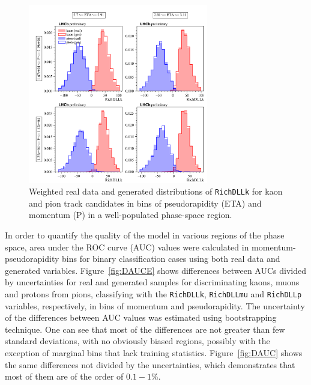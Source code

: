 \documentclass[a4paper]{jpconf}
\begin{document}
\begin{figure}
    \centering
    \includegraphics[width=0.7\textwidth]{kaon_vs_pion_RichDLLk_in_Brunel_P_vs_Brunel_ETA_8x8_S0_2_4_N_S1_2_4_N.pdf}
    \caption{Weighted real data and generated distributions of \texttt{RichDLLk} for kaon and pion track candidates in bins of pseudorapidity (ETA) and momentum (P) in a well-populated phase-space region.}
    \label{fig:RichDLLkZoomed}
\end{figure}

In order to quantify the quality of the model in various regions of the phase space, area under the ROC curve (AUC) values were calculated in momentum-pseudorapidity bins for binary classification cases using both real data and generated variables. Figure~\ref{fig:DAUCE} shows differences between AUCs divided by uncertainties for real and generated samples for discriminating kaons, muons and protons from pions, classifying with the \texttt{RichDLLk}, \texttt{RichDLLmu} and \texttt{RichDLLp} variables, respectively, in bins of momentum and pseudorapidity. The uncertainty of the differences between AUC values was estimated using bootstrapping technique. One can see that most of the differences are not greater than few standard deviations, with no obviously biased regions, possibly with the exception of marginal bins that lack training statistics. Figure~\ref{fig:DAUC} shows the same differences not divided by the uncertainties, which demonstrates that most of them are of the order of $0.1-1\%$.
\end{document}
